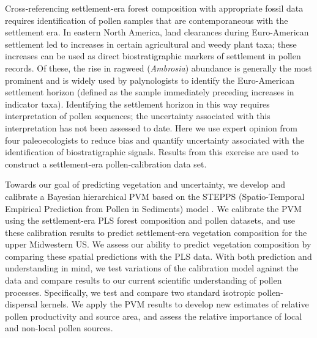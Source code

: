 \documentclass[12pt]{article}
\begin{document}
Cross-referencing settlement-era forest composition with appropriate
fossil data requires identification of pollen samples that are
contemporaneous with the settlement era.  In eastern North America,
land clearances during Euro-American settlement led to increases in
certain agricultural and weedy plant taxa; these increases can be used
as direct biostratigraphic markers of settlement in pollen records. Of
these, the rise in ragweed (\textit{Ambrosia}) abundance is generally
the most prominent \citep{mcandrews1988human} and is widely used by
palynologists to identify the Euro-American settlement horizon
(defined as the sample immediately preceding increases in indicator
taxa). Identifying the settlement horizon in this way requires
interpretation of pollen sequences; the uncertainty associated with
this interpretation has not been assessed to date. Here we use expert
opinion from four paleoecologists to reduce bias and quantify
uncertainty associated with the identification of biostratigraphic
signals. Results from this exercise are used to construct a
settlement-era pollen-calibration data set.

Towards our goal of predicting vegetation and uncertainty, we develop
and calibrate a Bayesian hierarchical PVM based on the STEPPS
(Spatio-Temporal Empirical Prediction from Pollen in Sediments) model
\citep{paciorek2009mapping}. We calibrate the PVM using the
settlement-era PLS forest composition and pollen datasets, and use
these calibration results to predict settlement-era vegetation
composition for the upper Midwestern US. We assess our ability to
predict vegetation composition by comparing these spatial predictions
with the PLS data. With both prediction and understanding in mind, we
test variations of the calibration model against the data and compare
results to our current scientific understanding of pollen
processes. Specifically, we test and compare two standard isotropic
pollen-dispersal kernels. We apply the PVM results to develop new
estimates of relative pollen productivity and source area, and assess
the relative importance of local and non-local pollen sources.

\end{document}
